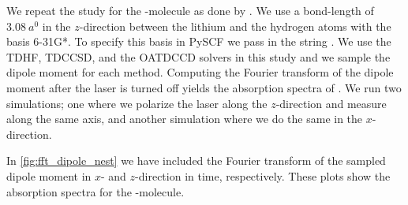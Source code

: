         We repeat the study for the -molecule as done by
        \citeauthor{nest}.
        We use a bond-length of $\SI{3.08}{\bohr}$ in the $z$-direction
        between the lithium and the hydrogen atoms with the basis 6-31G*.
        To specify this basis in PySCF we pass in the string .
        We use the TDHF, TDCCSD, and the OATDCCD solvers in this study and we
        sample the dipole moment for each method.
        Computing the Fourier transform of the dipole moment after the laser is
        turned off yields the absorption spectra of .
        We run two simulations; one where we polarize the laser along the
        $z$-direction and measure along the same axis, and another simulation
        where we do the same in the $x$-direction.

        In \autoref{fig:fft_dipole_nest} we have included the Fourier
        transform of the sampled dipole moment in $x$- and $z$-direction in
        time, respectively.
        These plots show the absorption spectra for the -molecule.
